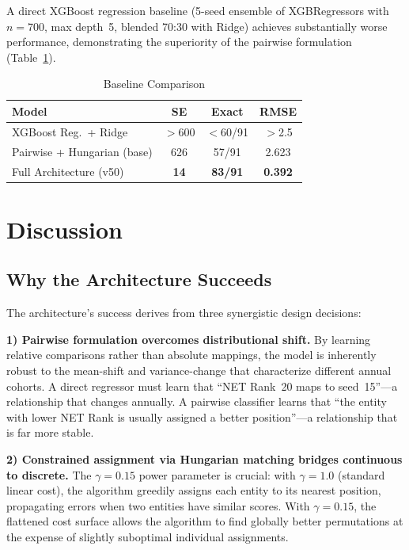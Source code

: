 \documentclass[conference]{IEEEtran}
\begin{document}
A direct XGBoost regression baseline (5-seed ensemble of XGBRegressors with $n=700$, max depth~5, blended 70:30 with Ridge) achieves substantially worse performance, demonstrating the superiority of the pairwise formulation (Table~\ref{tab:baseline}).

\begin{table}[htbp]
\centering
\caption{Baseline Comparison}
\label{tab:baseline}
\begin{tabular}{@{}lccc@{}}
\toprule
\textbf{Model} & \textbf{SE} & \textbf{Exact} & \textbf{RMSE} \\
\midrule
XGBoost Reg.\ + Ridge & $>$600 & $<$60/91 & $>$2.5 \\
Pairwise + Hungarian (base) & 626 & 57/91 & 2.623 \\
Full Architecture (v50) & \textbf{14} & \textbf{83/91} & \textbf{0.392} \\
\bottomrule
\end{tabular}
\end{table}

\section{Discussion}

\subsection{Why the Architecture Succeeds}

The architecture's success derives from three synergistic design decisions:

\textbf{1) Pairwise formulation overcomes distributional shift.} By learning relative comparisons rather than absolute mappings, the model is inherently robust to the mean-shift and variance-change that characterize different annual cohorts. A direct regressor must learn that ``NET Rank~20 maps to seed~15''---a relationship that changes annually. A pairwise classifier learns that ``the entity with lower NET Rank is usually assigned a better position''---a relationship that is far more stable.

\textbf{2) Constrained assignment via Hungarian matching bridges continuous to discrete.} The $\gamma = 0.15$ power parameter is crucial: with $\gamma = 1.0$ (standard linear cost), the algorithm greedily assigns each entity to its nearest position, propagating errors when two entities have similar scores. With $\gamma = 0.15$, the flattened cost surface allows the algorithm to find globally better permutations at the expense of slightly suboptimal individual assignments.
\end{document}
